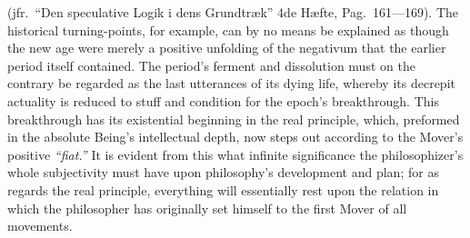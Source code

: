 \documentclass[12pt]{book}
\begin{document}
(jfr.\ ``Den speculative Logik i dens Grundtræk'' 4de Hæfte, Pag.\
161---169). The historical turning-points, for example, can by no means be
explained as though the new age were merely a positive unfolding of the
negativum that the earlier period itself contained. The period's ferment and
dissolution must on the contrary be regarded as the last utterances of its
dying life, whereby its decrepit actuality is reduced to stuff and condition
for the epoch's breakthrough. This breakthrough has its existential
beginning in the real principle, which, preformed in the absolute Being's
intellectual depth, now steps out according to the Mover's positive
\textit{``fiat.''} It is evident from this what infinite significance the
philosophizer's whole subjectivity must have upon philosophy's development
and plan; for as regards the real principle, everything will essentially
rest upon the relation in which the philosopher has originally set himself
to the first Mover of all movements.
\end{document}
